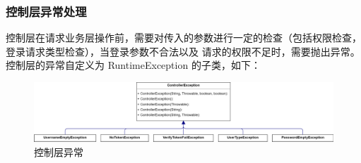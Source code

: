 \documentclass[12pt, a4paper]{article}
\begin{document}
\subsubsection{控制层异常处理}
控制层在请求业务层操作前，需要对传入的参数进行一定的检查（包括权限检查，登录请求类型检查），当登录参数不合法以及
请求的权限不足时，需要抛出异常。控制层的异常自定义为 RuntimeException 的子类，如下：
\begin{figure}[H]
	\centering
	\includegraphics[width = 0.9 \textwidth]{ControllerException.png}
	\caption{控制层异常}
\end{figure}
\end{document}
